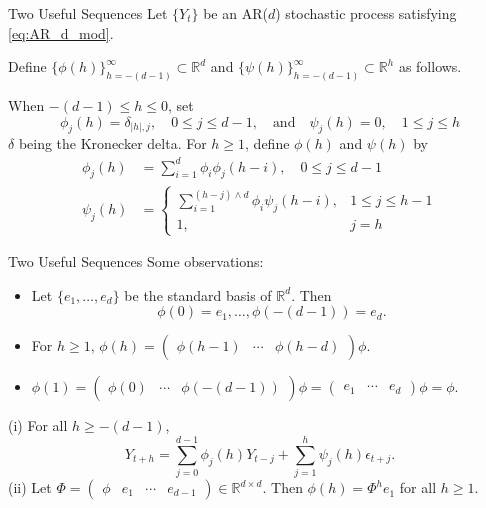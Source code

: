 \documentclass{beamer}
\def\R{\mathbb R}
\begin{document}
\begin{frame}{Two Useful Sequences}
    Let $\{Y_t\}$ be an AR($d$) stochastic process satisfying \eqref{eq:AR_d_mod}.

    \smallskip
    
    Define $\{\phi(h)\}_{h = -(d - 1)}^{\infty} \subset \R^d$ and $\{\psi(h)\}_{h = -(d - 1)}^{\infty} \subset \R^h$ as follows.
    
    When $-(d - 1) \le h \le 0$, set
    \[
    \phi_j(h) = \delta_{|h|, j}, \quad 0 \le j \le d - 1 \label{eq:phi_recur_rel1}, \quad \text{and} \quad
    \psi_j(h) = 0, \quad 1 \le j \le h
    \]
    $\delta$ being the Kronecker delta. For $h \ge 1$, define $\phi(h)$ and $\psi(h)$ by
    \begin{align*}
        \phi_j(h) &= \sum_{i = 1}^d \phi_i\phi_j(h - i), \quad 0 \le j \le d - 1 \\
        \psi_j(h) &=
        \begin{cases}
            \sum_{i = 1}^{(h - j) \wedge d} \phi_i\psi_j(h - i), & 1 \le j \le h - 1 \\
            1, & j = h
        \end{cases}
    \end{align*}
\end{frame}

\begin{frame}{Two Useful Sequences}
    Some observations:
    \begin{itemize}
        \item Let $\{e_1, \ldots, e_d\}$ be the standard basis of $\R^d$. Then
        \[
        \phi(0) = e_1, \ldots, \phi(-(d - 1)) = e_d.
        \]
        \item For $h \ge 1$, $\phi(h) = (\begin{matrix} \phi(h - 1) & \cdots & \phi(h - d) \end{matrix})\phi$.
        \item $\phi(1) = (\begin{matrix} \phi(0) & \cdots & \phi(-(d - 1)) \end{matrix})\phi = (\begin{matrix} e_1 & \cdots & e_d \end{matrix})\phi = \phi$.
    \end{itemize}
    \begin{lemma}
        (i) For all $h \ge -(d - 1)$,
        \[
        Y_{t + h} = \sum_{j = 0}^{d - 1} \phi_j(h)Y_{t - j} + \sum_{j = 1}^h \psi_j(h)\epsilon_{t + j}.
        \]
        (ii) Let $\Phi = (\begin{matrix} \phi & e_1 & \cdots & e_{d - 1} \end{matrix}) \in \R^{d \times d}$. Then $\phi(h) = \Phi^h e_1$ for all $h \ge 1$.
    \end{lemma}
\end{frame}
\end{document}
